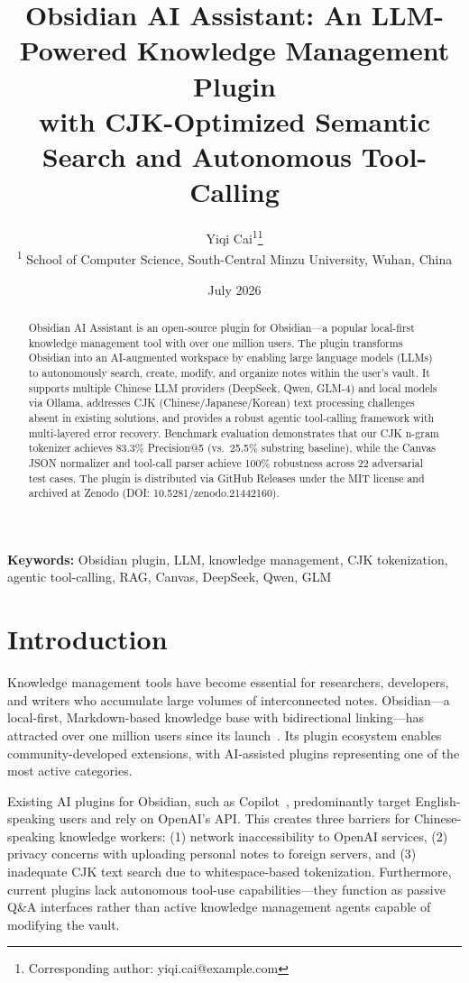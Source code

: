 \documentclass[10pt,a4paper]{article}
\title{Obsidian AI Assistant: An LLM-Powered Knowledge Management Plugin\\with CJK-Optimized Semantic Search and Autonomous Tool-Calling}
\author{
  Yiqi Cai\textsuperscript{1}\thanks{Corresponding author: yiqi.cai@example.com}\\[4pt]
  \textsuperscript{1} School of Computer Science, South-Central Minzu University, Wuhan, China
}
\date{July 2026}
\begin{document}
\maketitle

\begin{abstract}
Obsidian AI Assistant is an open-source plugin for Obsidian---a popular local-first knowledge management tool with over one million users. The plugin transforms Obsidian into an AI-augmented workspace by enabling large language models (LLMs) to autonomously search, create, modify, and organize notes within the user's vault. It supports multiple Chinese LLM providers (DeepSeek, Qwen, GLM-4) and local models via Ollama, addresses CJK (Chinese/Japanese/Korean) text processing challenges absent in existing solutions, and provides a robust agentic tool-calling framework with multi-layered error recovery. Benchmark evaluation demonstrates that our CJK n-gram tokenizer achieves 83.3\% Precision@5 (vs.\ 25.5\% substring baseline), while the Canvas JSON normalizer and tool-call parser achieve 100\% robustness across 22 adversarial test cases. The plugin is distributed via GitHub Releases under the MIT license and archived at Zenodo (DOI: 10.5281/zenodo.21442160).
\end{abstract}

\noindent\textbf{Keywords:} Obsidian plugin, LLM, knowledge management, CJK tokenization, agentic tool-calling, RAG, Canvas, DeepSeek, Qwen, GLM

\section{Introduction}

Knowledge management tools have become essential for researchers, developers, and writers who accumulate large volumes of interconnected notes. Obsidian---a local-first, Markdown-based knowledge base with bidirectional linking---has attracted over one million users since its launch~\cite{obsidian}. Its plugin ecosystem enables community-developed extensions, with AI-assisted plugins representing one of the most active categories.

Existing AI plugins for Obsidian, such as Copilot~\cite{obsidian_copilot}, predominantly target English-speaking users and rely on OpenAI's API. This creates three barriers for Chinese-speaking knowledge workers: (1) network inaccessibility to OpenAI services, (2) privacy concerns with uploading personal notes to foreign servers, and (3) inadequate CJK text search due to whitespace-based tokenization. Furthermore, current plugins lack autonomous tool-use capabilities---they function as passive Q\&A interfaces rather than active knowledge management agents capable of modifying the vault.
\end{document}
